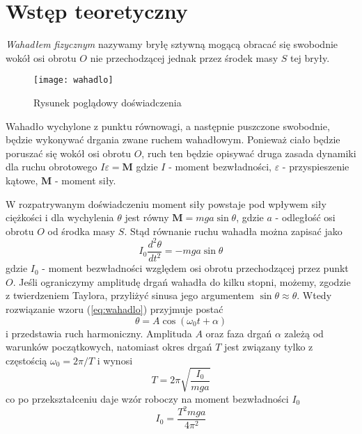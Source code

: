 \documentclass[a4paper,10pt,twoside]{article}
\begin{document}
\section{Wstęp teoretyczny}
\emph{Wahadłem fizycznym} nazywamy bryłę sztywną mogącą obracać się swobodnie wokół osi obrotu $O$
nie przechodzącej jednak przez środek masy $S$ tej bryły.

\begin{wrapfigure}{r}{0.4\textwidth}
	\begin{center}
		\texttt{[image: wahadlo]}
	\end{center}
	\caption{Rysunek poglądowy doświadczenia}
	\label{fig:wahadlo}
\end{wrapfigure}

Wahadło wychylone z punktu równowagi, a następnie puszczone swobodnie, będzie wykonywać drgania zwane ruchem wahadłowym.
Ponieważ ciało będzie poruszać się wokół osi obrotu $O$, ruch ten będzie opisywać druga zasada dynamiki dla ruchu obrotowego
$I\varepsilon=\mathbf{M}$ gdzie $I$ - moment bezwładności, $\varepsilon$ - przyspieszenie kątowe, $\mathbf{M}$ - moment siły.

W rozpatrywanym doświadczeniu moment siły powstaje pod wpływem siły ciężkości i dla wychylenia $\theta$ jest równy $\mathbf{M} = mga\sin\theta$,
gdzie $a$ - odległość osi obrotu $O$ od środka masy $S$. Stąd równanie ruchu wahadła można zapisać jako
\begin{equation}
\label{eq:wahadlo}
I_0\frac{d^2\theta}{dt^2}=-mga\sin\theta
\end{equation}
gdzie $I_0$ - moment bezwładności względem osi obrotu przechodzącej przez punkt $O$. Jeśli ograniczymy amplitudę drgań wahadła do kilku stopni,
możemy, zgodzie z twierdzeniem Taylora, przyliżyć sinusa jego argumentem $\sin\theta\approx\theta$. Wtedy rozwiązanie wzoru (\ref{eq:wahadlo})
przyjmuje postać
\begin{equation}
\label{eq:oscylator}
\theta = A \cos\left(\omega_0t+\alpha\right)
\end{equation}
i przedstawia ruch harmoniczny. Amplituda $A$ oraz faza drgań $\alpha$ zależą od warunków początkowych, natomiast okres drgań $T$ jest związany tylko
z częstością $\omega_0=2\pi/T$ i wynosi
\begin{equation}
T = 2\pi\sqrt{\frac{I_0}{mga}}
\end{equation}
co po przekształceniu daje wzór roboczy na moment bezwładności $I_0$
\begin{equation}
\label{eq:bezwladnosc}
I_0 = \frac{T^2mga}{4\pi^2}
\end{equation}
\end{document}

